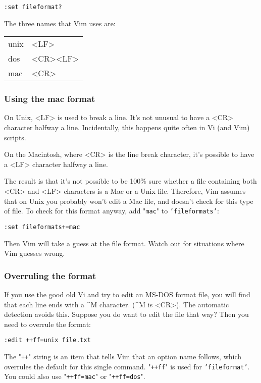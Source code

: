 \begin{Verbatim}[samepage=true]
 :set fileformat?
\end{Verbatim}

The three names that Vim uses are:
\begin{center} \begin{tabular}{l l}
				unix & <LF> \\
				dos & <CR><LF> \\
				mac & <CR>
\end{tabular} \end{center}
\subsubsection{Using the mac format}
On Unix, <LF> is used to break a line.
It's not unusual to have a <CR> character halfway a line.
Incidentally, this happens quite often in Vi (and Vim) scripts.

On the Macintosh, where <CR> is the line break character, it's possible to have a <LF> character halfway a line.

The result is that it's not possible to be 100\% sure whether a file containing both <CR> and <LF> characters is a Mac or a Unix file.
Therefore, Vim assumes that on Unix you probably won't edit a Mac file, and doesn't check for this type of file.
To check for this format anyway, add "\texttt{mac}" to \texttt{'fileformats'}:

\begin{Verbatim}[samepage=true]
 :set fileformats+=mac
\end{Verbatim}

Then Vim will take a guess at the file format.
Watch out for situations where Vim guesses wrong.
\subsubsection{Overruling the format}
If you use the good old Vi and try to edit an MS-DOS format file, you will find that each line ends with a \textasciicircum M character.
(\textasciicircum M is <CR>).
The automatic detection avoids this.
Suppose you do want to edit the file that way?  Then you need to overrule the format:

\begin{Verbatim}[samepage=true]
 :edit ++ff=unix file.txt
\end{Verbatim}

The "\texttt{++}" string is an item that tells Vim that an option name follows, which overrules the default for this single command.
"\texttt{++ff}" is used for \texttt{'fileformat'}.
You could also use "\texttt{++ff=mac}" or "\texttt{++ff=dos}".

